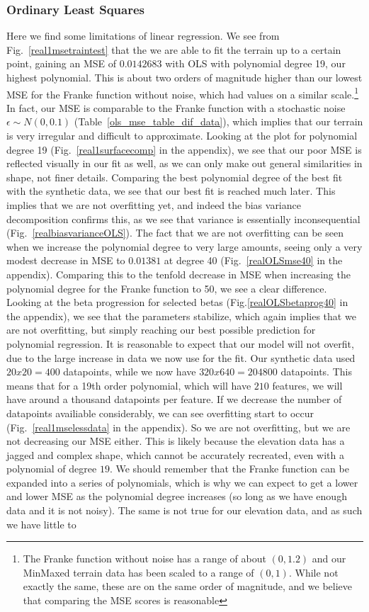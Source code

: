 \documentclass[twocolumn,10pt,cleanfoot]{asme2ej}
\begin{document}
\subsubsection{Ordinary Least Squares}

Here we find some limitations of linear regression. We see from Fig.~\ref{real1msetraintest} that the we are able to fit the terrain up to a certain point, gaining an MSE of $0.0142683$ with OLS with polynomial degree 19, our highest polynomial. This is about two orders of magnitude higher than our lowest MSE for the Franke function without noise, which had values on a similar scale.\footnote{The Franke function without noise has a range of about $(0,1.2)$ and our MinMaxed terrain data has been scaled to a range of $(0,1)$. While not exactly the same, these are on the same order of magnitude, and we believe that comparing the MSE scores is reasonable} In fact, our MSE is comparable to the Franke function with a stochastic noise $\epsilon \sim N(0,0.1)$ (Table~\ref{ols_mse_table_dif_data}), which implies that our terrain is very irregular and difficult to approximate. Looking at the plot for polynomial degree 19 (Fig.~\ref{real1surfacecomp} in the appendix), we see that our poor MSE is reflected visually in our fit as well, as we can only make out general similarities in shape, not finer details. Comparing the best polynomial degree of the best fit with the synthetic data, we see that our best fit is reached much later. This implies that we are not overfitting yet, and indeed the bias variance decomposition confirms this, as we see that variance is essentially inconsequential (Fig.~\ref{realbiasvarianceOLS}). The fact that we are not overfitting can be seen when we increase the polynomial degree to very large amounts, seeing only a very modest decrease in MSE to $0.01381$ at degree 40 (Fig.~\ref{realOLSmse40} in the appendix). Comparing this to the tenfold decrease in MSE when increasing the polynomial degree for the Franke function to 50, we see a clear difference. Looking at the beta progression for selected betas (Fig.\ref{realOLSbetaprog40} in the appendix), we see that the parameters stabilize, which again implies that we are not overfitting, but simply reaching our best possible prediction for polynomial regression. It is reasonable to expect that our model will not overfit, due to the large increase in data we now use for the fit. Our synthetic data used $20 x 20 = 400$ datapoints, while we now have $320 x 640 = 204 800$ datapoints. This means that for a 19th order polynomial, which will have $210$ features, we will have around a thousand datapoints per feature. If we decrease the number of datapoints availiable considerably, we can see overfitting start to occur (Fig.~\ref{real1mselessdata} in the appendix). So we are not overfitting, but we are not decreasing our MSE either. This is likely because the elevation data has a jagged and complex shape, which cannot be accurately recreated, even with a polynomial of degree $19$. We should remember that the Franke function can be expanded into a series of polynomials, which is why we can expect to get a lower and lower MSE as the polynomial degree increases (so long as we have enough data and it is not noisy). The same is not true for our elevation data, and as such we have little to 
\end{document}

